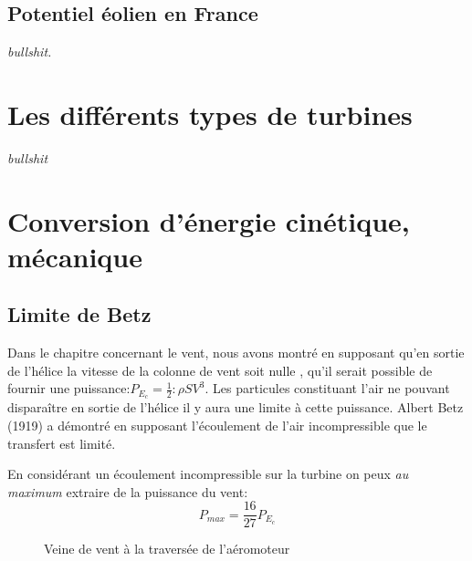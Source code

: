 \documentclass[main.tex]{subfiles}
\begin{document}
\subsection{Potentiel éolien en France}
\emph{bullshit.}

\section{Les différents types de turbines}
\emph{bullshit}
\section{Conversion d'énergie cinétique, mécanique}
\subsection{Limite de Betz}
Dans le chapitre concernant le vent, nous avons montré en supposant qu'en sortie de l'hélice la vitesse de la colonne de vent soit nulle , qu'il serait possible de fournir une puissance:$ P_{E_c} =\frac{1}{2}:\rho SV^3$.
Les particules constituant l'air ne pouvant disparaître en sortie de l'hélice il y  aura une limite à cette puissance. Albert Betz (1919) a démontré en supposant l'écoulement de l'air incompressible que le transfert est limité.
\begin{prop}
  En considérant un écoulement incompressible sur la turbine on peux \emph{au maximum} extraire de la puissance du vent:
\[
P_{max} = \frac{16}{27}P_{E_c}
\]
\end{prop}
\begin{figure}[H]
  \centering
  \caption{Veine de vent à la traversée de l'aéromoteur}
\end{figure}
\end{document}
